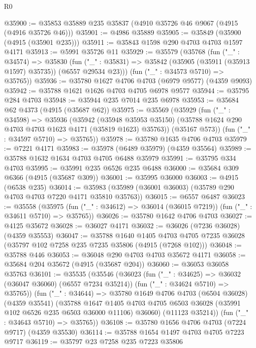 \begin{lexlean}{R0}
\begin{coremodule}
@35900 := @35853 @35889 @235 @35837 (@4910 @35726 @46 @9067 (@4915 (@4916 @35726 @46)))
@35901 := @4986 @35889
@35905 := @35849 (@35900 (@4915 (@35901 @235)))
@35911 := @35843 @1598 @290 @4703 @4703 @1597 @4171
@35913 := @5991 @35726 @11
@35929 := @35579
    (@35768
      (fun ("_" : @34574) =>
      @35830
        (fun ("_" : @35831) => @35842 (@35905 (@35911 (@35913 @1597) @35735)) (@6557 @29534 @23)))
      (fun ("_" : @34573 @5710) => @35765))
@35936 := @35780 @1627 @4706 @4703 (@6979 @9577) (@4359 @9093)
@35942 := @35788 @1621 @1626 @4703 @4705 @6978 @9577
@35944 := @35795 @284 @4703
@35948 := @35944 @235 @7014 @235 @6978
@35953 := @35684 @62 @4373 (@4915 (@35687 @62))
@35975 := @35569
    (@35929
      (fun ("_" : @34598) =>
      @35936
        (@35942
          (@35948 @35953 @35150)
          (@35788 @1624 @290 @4703 @4703 @1623 @4171 (@35819 @1623) @35763))
        (@35167 @573))
      (fun ("_" : @34597 @5710) => @35765))
@35978 := @35780 @1635 @4706 @4703
@35979 := @7221 @4171
@35983 := @35978 (@6489 @35979) (@4359 @35564)
@35989 := @35788 @1632 @1634 @4703 @4705 @6488 @35979
@35991 := @35795 @334 @4703
@35995 := @35991 @235 @6526 @235 @6488
@36000 := @35684 @309 @6366 (@4915 (@35687 @309))
@36001 := @35995 @36000
@36003 := @4915 (@6538 @235)
@36014 := @35983 (@35989 (@36001 @36003) (@35789 @290 @4703 @4703 @7220 @4171 @35810 @35763))
@36015 := @6557 @6487
@36023 := @35558
    (@35975 (fun ("_" : @34612) => @36014 (@36015 @7219)) (fun ("_" : @34611 @5710) => @35765))
@36026 := @35780 @1642 @4706 @4703
@36027 := @4125 @35672
@36028 := @36027 @4171
@36032 := @36026 (@7236 @36028) (@4359 @35553)
@36047 := @35788
    @1640
    @1405
    @4703
    @4705
    @7235
    @36028
    (@35797 @102 @7258 @235 @7235 @35806 (@4915 (@7268 @102)))
@36048 := @35788 @446
@36053 := @36048 @290 @4703 @4703 @35672 @4171
@36058 := @35684 @204 @35672 (@4915 (@35687 @204))
@36060 := @36053 @36058 @35763
@36101 := @35535
    (@35546
      (@36023
        (fun ("_" : @34625) => @36032 (@36047 @36060) (@6557 @7234 @35214))
        (fun ("_" : @34624 @5710) => @35765))
      (fun ("_" : @34644) =>
      @35780
        @1649
        @4706
        @4703
        (@6504 @36028)
        (@4359 @35541)
        (@35788
          @1647
          @1405
          @4703
          @4705
          @6503
          @36028
          (@35991 @102 @6526 @235 @6503 @36000 @11106)
          @36060)
        (@11123 @35214))
      (fun ("_" : @34643 @5710) => @35765))
@36108 := @35780 @1656 @4706 @4703 (@7224 @9717) (@4359 @35530)
@36114 := @35788 @1654 @1497 @4703 @4705 @7223 @9717
@36119 := @35797 @23 @7258 @235 @7223 @35806

\end{coremodule}
\end{lexlean}
